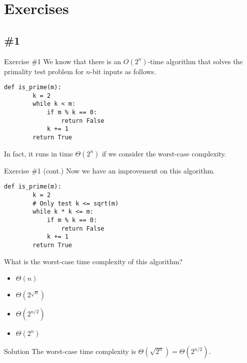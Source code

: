 \documentclass{beamer}
\begin{document}
\section{Exercises}
\subsection{\#1}
\begin{frame}[fragile]{Exercise \#1}
  We know that there is an $O(2^n)$-time algorithm that solves the primality
  test problem for $n$-bit inputs as follows.
  \begin{block}{}
    \scriptsize
    \begin{lstlisting}[gobble=4]
    def is_prime(m):
        k = 2
        while k < m:
            if m % k == 0:
                return False
            k += 1
        return True
    \end{lstlisting}
    \pause
  \end{block}
  In fact, it runs in time $\Theta(2^n)$ if we consider the worst-case
  complexity.
\end{frame}

\begin{frame}[fragile]{Exercise \#1 (cont.)}
  Now we have an improvement on this algorithm.
  \begin{block}{}
    \scriptsize
    \begin{lstlisting}[gobble=4]
    def is_prime(m):
        k = 2
        # Only test k <= sqrt(m)
        while k * k <= m:
            if m % k == 0:
                return False
            k += 1
        return True
    \end{lstlisting}
    \pause
  \end{block}
  What is the worst-case time complexity of this algorithm?
  \begin{multicols}{4}
    \begin{itemize}
      \item $\Theta(n)$
      \item $\Theta(2^{\sqrt{n}})$
      \item $\Theta(2^{n/2})$
      \item $\Theta(2^n)$ \pause
    \end{itemize}
  \end{multicols}
  \begin{block}{Solution}
    The worst-case time complexity is $\Theta(\sqrt{2^n}) = \Theta(2^{n/2})$.
  \end{block}
\end{frame}
\end{document}
